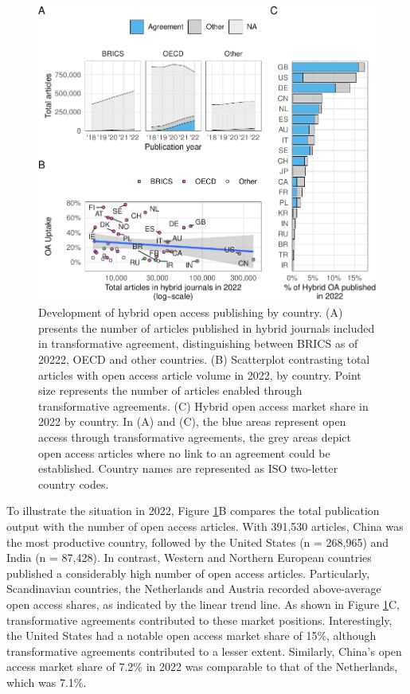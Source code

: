 \documentclass[a4paper,man,floatsintext,longtable,noextraspace,12pt]{apa6}
\begin{document}
\begin{figure}[ht!]

{\centering \includegraphics[width=0.99\linewidth,]{fig/country_patch-1} 

}

\caption{Development of hybrid open access publishing by country. (A) presents the number of articles published in hybrid journals included in transformative agreement, distinguishing between BRICS as of 20222, OECD and other countries. (B) Scatterplot contrasting total articles with open access article volume in 2022, by country. Point size represents the number of articles enabled through transformative agreements. (C) Hybrid open access market share in 2022 by country. In (A) and (C), the blue areas represent open access through transformative agreements, the grey areas depict open access articles where no link to an agreement could be established. Country names are represented as ISO two-letter country codes.}\label{fig:country_patch}
\end{figure}

To illustrate the situation in 2022, Figure \ref{fig:country_patch}B
compares the total publication output with the number of open access
articles. With 391,530 articles, China was the most productive country,
followed by the United States (n = 268,965) and India (n = 87,428). In
contrast, Western and Northern European countries published a
considerably high number of open access articles. Particularly,
Scandinavian countries, the Netherlands and Austria recorded
above-average open access shares, as indicated by the linear trend line.
As shown in Figure \ref{fig:country_patch}C, transformative agreements
contributed to these market positions. Interestingly, the United States
had a notable open access market share of 15\%, although transformative
agreements contributed to a lesser extent. Similarly, China's open
access market share of 7.2\% in 2022 was comparable to that of the
Netherlands, which was 7.1\%.
\end{document}
